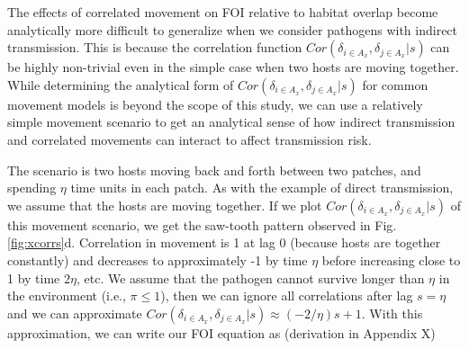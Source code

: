 \documentclass[letterpaper]{article}
\begin{document}
The effects of correlated movement on FOI relative to habitat overlap become analytically more difficult to generalize when we consider pathogens with indirect transmission.  This is because the correlation function $Cor(\delta_{i \in A_x}, \delta_{j \in A_x} | s)$ can be highly non-trivial even in the simple case when two hosts are moving together.  
While determining the analytical form of $Cor(\delta_{i \in A_x}, \delta_{j \in A_x} | s)$ for common movement models is beyond the scope of this study, we can use a relatively simple movement scenario to get an analytical sense of how indirect transmission and correlated movements can interact to affect transmission risk.

The scenario is two hosts moving back and forth between two patches, and spending $\eta$ time units in each patch.  As with the example of direct transmission, we assume that the hosts are moving together. If we plot $Cor(\delta_{i \in A_x}, \delta_{j \in A_x} | s)$ of this movement scenario, we get the saw-tooth pattern observed in Fig. \ref{fig:xcorrs}d.  
Correlation in movement is 1 at lag 0 (because hosts are together constantly) and decreases to approximately -1 by time $\eta$ before increasing close to 1 by time $2\eta$, etc. 
We assume that the pathogen cannot survive longer than $\eta$ in the environment (i.e., $\pi \leq 1$), then we can ignore all correlations after lag $s = \eta$ and we can approximate $Cor(\delta_{i \in A_x}, \delta_{j \in A_x} | s) \approx (-2 / \eta)s + 1$.  With this approximation, we can write our FOI equation as (derivation in Appendix X)
\end{document}
